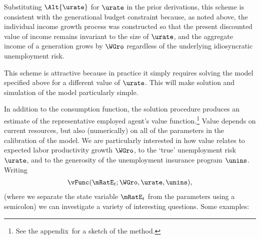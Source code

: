 \documentclass{\handout}
\begin{document}
\begin{CDCPrivate}
Substituting $\Alt{\urate}$ for $\urate$ in the prior derivations,
this scheme is consistent with the generational budget constraint
because, as noted above, the individual income growth process was constructed so
that the present discounted value of income remains invariant to the
size of $\urate$, and the aggregate income of a generation grows by
$\WGro$ regardless of the underlying idiosyncratic unemployment risk.  

This scheme is attractive because in practice it simply requires solving 
the model specified above for a different value of $\urate$.  This will make
solution and simulation of the model particularly simple.

In addition to the consumption function, the solution procedure produces an
estimate of the representative employed agent's value function.\footnote{See the appendix\ for a sketch of the method.}  Value depends
on current resources, but also (numerically) on all of the parameters in the
calibration of the model.  We are particularly interested in how value 
relates to expected labor productivity growth $\WGro$, to the `true' unemployment risk 
$\urate$, and to the generosity of the unemployment insurance program $\unins$.
Writing
\begin{equation}\begin{gathered}\begin{aligned}
  \vFunc(\mRatE_{t};\WGro,\urate,\unins),
\end{aligned}\end{gathered}\end{equation}
(where we separate the state variable $\mRatE_{t}$ from the parameters using a semicolon) we can investigate a variety of interesting questions.  Some examples:


\end{CDCPrivate}
\end{document}
